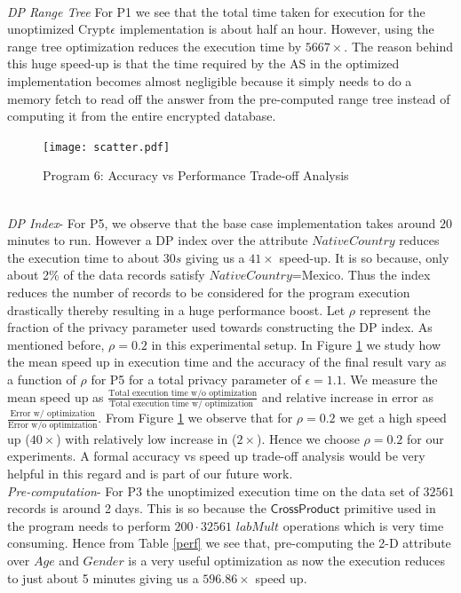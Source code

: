 \\
\textit{DP Range Tree}
 For P1 we see that the total time taken for execution for the unoptimized Crypt$\epsilon$ implementation is about half an hour. However, using the range tree optimization reduces the execution time by $5667\times$. The reason behind this huge speed-up is that the time required by the \textsf{AS} in the optimized implementation becomes almost negligible because it simply needs to do a memory fetch to read off the answer from the pre-computed range tree instead of computing it from the entire encrypted database. 
 \begin{figure}[ht]
    
     \texttt{[image: scatter.pdf]}
        \caption{Program 6: Accuracy vs Performance Trade-off Analysis }\label{scatter}
    \end{figure}
\\\textit{DP Index}- For P5, we observe that the base case implementation takes around $20$ minutes to run. However  a DP index over the attribute $NativeCountry$  reduces the execution time to about $30s$ giving us a $41\times $ speed-up. It is so because, only about 2\% of the data records satisfy $NativeCountry$=Mexico. Thus the index reduces the number of records to be considered for the program execution drastically thereby resulting in a huge performance boost. %
Let $\rho$ represent the fraction of the privacy parameter used towards constructing the DP index. As mentioned before, $\rho=0.2$ in this experimental setup.  In Figure \ref{scatter} we study how the mean speed up in execution time and the accuracy of the final result vary as a function of $\rho$ for P5 for a total privacy parameter of $\epsilon=1.1$. We measure the mean speed up as $\frac{\text{Total execution time w/o optimization}}{\text{Total execution time w/ optimization }}$ and relative increase in error as $\frac{\text{Error w/ optimization}}{\text{Error w/o optimization}}$. From Figure \ref{scatter} we observe that for $\rho=0.2$ we get a high speed up ($40\times$) with relatively low increase in ($2\times$). Hence we choose $\rho=0.2$ for our experiments. A formal accuracy vs speed up trade-off analysis would be very helpful in this regard and is part of our future work.
 \\\textit{Pre-computation}- For P3 the unoptimized execution time on the data set of $32561$ records is around 2 days. This is so because the $\textsf{CrossProduct}$ primitive used in the program needs to perform $200\cdot 32561$ $labMult$ operations which is very time consuming. Hence from Table \ref{perf} we see that, pre-computing the 2-D attribute over $Age$ and $Gender$ is a very useful optimization as now the execution reduces to just about 5 minutes giving us a $596.86\times$ speed up. \\ %
